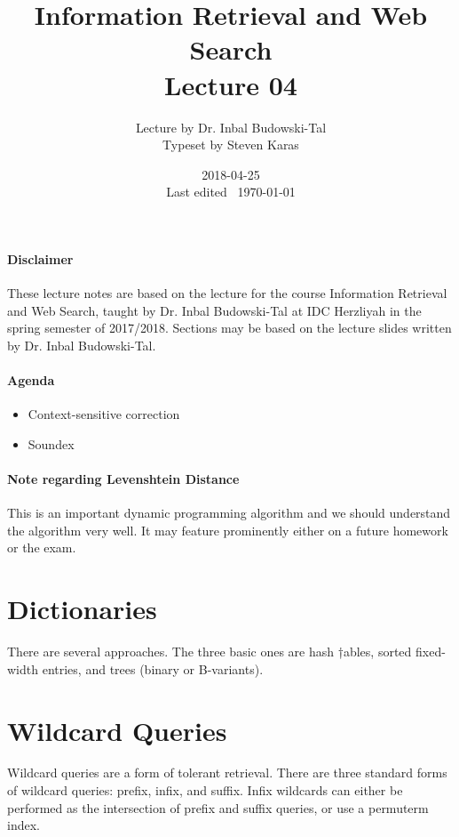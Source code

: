 \documentclass{idc_msc}
\title{Information Retrieval and Web Search\\\large Lecture 04}
\date{2018-04-25 \\ Last edited \currenttime\ \today}
\author{Lecture by Dr. Inbal Budowski-Tal\\Typeset by Steven Karas}
\begin{document}
\maketitle

\paragraph{Disclaimer}

These lecture notes are based on the lecture for the course Information Retrieval and Web Search, taught by Dr. Inbal Budowski-Tal at IDC Herzliyah in the spring semester of 2017/2018.
Sections may be based on the lecture slides written by Dr. Inbal Budowski-Tal.

\paragraph{Agenda}

\begin{itemize}
  \item Context-sensitive correction
  \item Soundex
\end{itemize}

\nocite{manning2008introduction}

\paragraph{Note regarding Levenshtein Distance}

This is an important dynamic programming algorithm and we should understand the algorithm very well.
It may feature prominently either on a future homework or the exam.


\section{Dictionaries}

There are several approaches. The three basic ones are hash †ables, sorted fixed-width entries, and trees (binary or B-variants).

\section{Wildcard Queries}

Wildcard queries are a form of tolerant retrieval.
There are three standard forms of wildcard queries: prefix, infix, and suffix.
Infix wildcards can either be performed as the intersection of prefix and suffix queries, or use a permuterm index.
\end{document}
